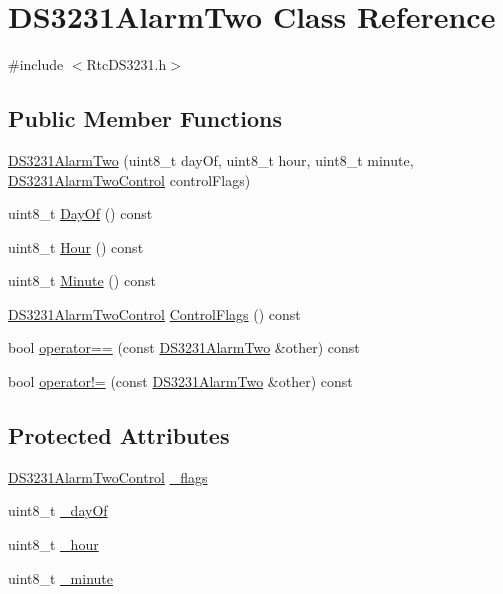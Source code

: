 \hypertarget{class_d_s3231_alarm_two}{}\section{D\+S3231\+Alarm\+Two Class Reference}
\label{class_d_s3231_alarm_two}


{\ttfamily \#include $<$Rtc\+D\+S3231.\+h$>$}

\subsection*{Public Member Functions}
\begin{DoxyCompactItemize}
\item 
\hyperlink{class_d_s3231_alarm_two_a3c6f0c670f12762b5993f880705e68b0}{D\+S3231\+Alarm\+Two} (uint8\+\_\+t day\+Of, uint8\+\_\+t hour, uint8\+\_\+t minute, \hyperlink{_rtc_d_s3231_8h_a453a5caa2fec7d65bbc41f1b3e93a8ea}{D\+S3231\+Alarm\+Two\+Control} control\+Flags)
\item 
uint8\+\_\+t \hyperlink{class_d_s3231_alarm_two_a72b6d46c170d2ef3d109d00746c77352}{Day\+Of} () const 
\item 
uint8\+\_\+t \hyperlink{class_d_s3231_alarm_two_addc641dc477c282f1a87a9558d173671}{Hour} () const 
\item 
uint8\+\_\+t \hyperlink{class_d_s3231_alarm_two_a3a2586eaf54c45d899d7ddbb474f1bd3}{Minute} () const 
\item 
\hyperlink{_rtc_d_s3231_8h_a453a5caa2fec7d65bbc41f1b3e93a8ea}{D\+S3231\+Alarm\+Two\+Control} \hyperlink{class_d_s3231_alarm_two_ac6e95cb84b2a7e80bbb9103c1c8aa69b}{Control\+Flags} () const 
\item 
bool \hyperlink{class_d_s3231_alarm_two_a50c777c8fd2a0f80ffd6498ce491d49c}{operator==} (const \hyperlink{class_d_s3231_alarm_two}{D\+S3231\+Alarm\+Two} \&other) const 
\item 
bool \hyperlink{class_d_s3231_alarm_two_a23655aec8cb16d27397e134b2d85ef99}{operator!=} (const \hyperlink{class_d_s3231_alarm_two}{D\+S3231\+Alarm\+Two} \&other) const 
\end{DoxyCompactItemize}
\subsection*{Protected Attributes}
\begin{DoxyCompactItemize}
\item 
\hyperlink{_rtc_d_s3231_8h_a453a5caa2fec7d65bbc41f1b3e93a8ea}{D\+S3231\+Alarm\+Two\+Control} \hyperlink{class_d_s3231_alarm_two_af3ff262fa5904d0c71f8009a2c165174}{\+\_\+flags}
\item 
uint8\+\_\+t \hyperlink{class_d_s3231_alarm_two_adb85a9af4e0e69a81b6deac0dddd2ed5}{\+\_\+day\+Of}
\item 
uint8\+\_\+t \hyperlink{class_d_s3231_alarm_two_a43f36d078c7268e3d810bf9eb99f2d30}{\+\_\+hour}
\item 
uint8\+\_\+t \hyperlink{class_d_s3231_alarm_two_a3d31a41a21535dbf1424dbec48dcdbbb}{\+\_\+minute}
\end{DoxyCompactItemize}



